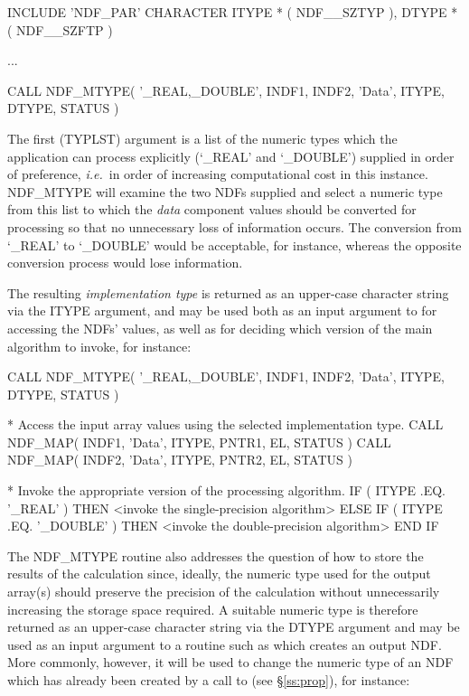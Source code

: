 \documentclass[twoside,11pt,nolof]{starlink}
\providecommand{\st}[1]{{\emph{#1}}}
\begin{document}
\small
\begin{terminalv}
      INCLUDE 'NDF_PAR'
      CHARACTER ITYPE * ( NDF__SZTYP ), DTYPE * ( NDF__SZFTP )

      ...

      CALL NDF_MTYPE( '_REAL,_DOUBLE', INDF1, INDF2, 'Data', ITYPE, DTYPE, STATUS )
\end{terminalv}
\normalsize

The first (TYPLST) argument is a list of the numeric types which the
application can process explicitly (`\_REAL' and `\_DOUBLE') supplied in
order of preference, \st{i.e.}\ in order of increasing computational cost in
this instance.
NDF\_MTYPE will examine the two NDFs supplied and select a numeric type from
this list to which the \st{data\/} component values should be converted for
processing so that no unnecessary loss of information occurs.
The conversion from `\_REAL' to `\_DOUBLE' would be acceptable, for
instance, whereas the opposite conversion process would lose information.

The resulting \st{implementation type\/} is returned as an upper-case
character string via the ITYPE argument, and may be used both as an input
argument to  for accessing the NDFs' values, as well as for deciding
which version of the main algorithm to invoke, for instance:

\small
\begin{terminalv}
      CALL NDF_MTYPE( '_REAL,_DOUBLE', INDF1, INDF2, 'Data', ITYPE, DTYPE, STATUS )

*  Access the input array values using the selected implementation type.
      CALL NDF_MAP( INDF1, 'Data', ITYPE, PNTR1, EL, STATUS )
      CALL NDF_MAP( INDF2, 'Data', ITYPE, PNTR2, EL, STATUS )

*  Invoke the appropriate version of the processing algorithm.
      IF ( ITYPE .EQ. '_REAL' ) THEN
         <invoke the single-precision algorithm>
      ELSE IF ( ITYPE .EQ. '_DOUBLE' ) THEN
         <invoke the double-precision algorithm>
      END IF
\end{terminalv}
\normalsize

The NDF\_MTYPE routine also addresses the question of how to store the
results of the calculation since, ideally, the numeric type used for the
output array(s) should preserve the precision of the calculation without
unnecessarily increasing the storage space required.
A suitable numeric type is therefore returned as an upper-case character
string via the DTYPE argument and may be used as an input argument to a
routine such as  which creates an output NDF.
More commonly, however, it will be used to change the numeric type of an NDF
which has already been created by a call to  (see \S\ref{ss:prop}),
for instance:
\end{document}
